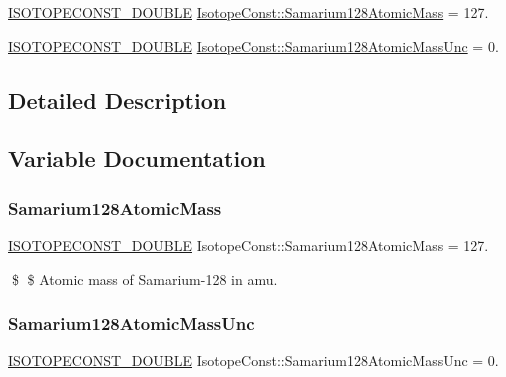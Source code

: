 \begin{DoxyCompactItemize}
\item 
\mbox{\hyperlink{group___isotope_const-_macros_ga8f45a7272ce02c0b4c65c44636ed719a}{I\+S\+O\+T\+O\+P\+E\+C\+O\+N\+S\+T\+\_\+\+D\+O\+U\+B\+LE}} \mbox{\hyperlink{group___isotope_const-_samarium-_sm128_ga8cee028c119d6b7c8f7915957716368b}{Isotope\+Const\+::\+Samarium128\+Atomic\+Mass}} = 127.
\item 
\mbox{\hyperlink{group___isotope_const-_macros_ga8f45a7272ce02c0b4c65c44636ed719a}{I\+S\+O\+T\+O\+P\+E\+C\+O\+N\+S\+T\+\_\+\+D\+O\+U\+B\+LE}} \mbox{\hyperlink{group___isotope_const-_samarium-_sm128_gad10fd0ea34b021044f96d6f1d2a1eb25}{Isotope\+Const\+::\+Samarium128\+Atomic\+Mass\+Unc}} = 0.
\end{DoxyCompactItemize}


\subsection{Detailed Description}


\subsection{Variable Documentation}
\mbox{\label{group___isotope_const-_samarium-_sm128_ga8cee028c119d6b7c8f7915957716368b}} 
\subsubsection{\texorpdfstring{Samarium128\+Atomic\+Mass}{Samarium128AtomicMass}}
{\footnotesize\ttfamily \mbox{\hyperlink{group___isotope_const-_macros_ga8f45a7272ce02c0b4c65c44636ed719a}{I\+S\+O\+T\+O\+P\+E\+C\+O\+N\+S\+T\+\_\+\+D\+O\+U\+B\+LE}} Isotope\+Const\+::\+Samarium128\+Atomic\+Mass = 127.}

\$ \$ Atomic mass of Samarium-\/128 in amu. \mbox{\label{group___isotope_const-_samarium-_sm128_gad10fd0ea34b021044f96d6f1d2a1eb25}} 
\subsubsection{\texorpdfstring{Samarium128\+Atomic\+Mass\+Unc}{Samarium128AtomicMassUnc}}
{\footnotesize\ttfamily \mbox{\hyperlink{group___isotope_const-_macros_ga8f45a7272ce02c0b4c65c44636ed719a}{I\+S\+O\+T\+O\+P\+E\+C\+O\+N\+S\+T\+\_\+\+D\+O\+U\+B\+LE}} Isotope\+Const\+::\+Samarium128\+Atomic\+Mass\+Unc = 0.}

